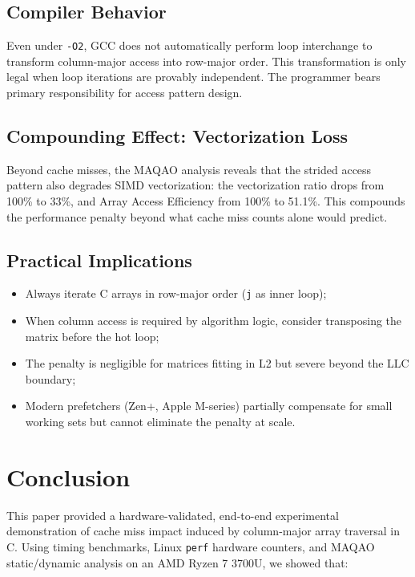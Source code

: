 \documentclass[conference]{IEEEtran}
\begin{document}
\subsection{Compiler Behavior}

Even under \texttt{-O2}, GCC does not automatically perform loop interchange to
transform column-major access into row-major order. This transformation is only
legal when loop iterations are provably independent. The programmer bears
primary responsibility for access pattern design.

\subsection{Compounding Effect: Vectorization Loss}

Beyond cache misses, the MAQAO analysis reveals that the strided access pattern
also degrades SIMD vectorization: the vectorization ratio drops from 100\% to
33\%, and Array Access Efficiency from 100\% to 51.1\%. This compounds the
performance penalty beyond what cache miss counts alone would predict.

\subsection{Practical Implications}

\begin{itemize}
  \item Always iterate C arrays in row-major order (\texttt{j} as inner loop);
  \item When column access is required by algorithm logic, consider transposing
        the matrix before the hot loop;
  \item The penalty is negligible for matrices fitting in L2 but severe beyond
        the LLC boundary;
  \item Modern prefetchers (Zen+, Apple M-series) partially compensate for
        small working sets but cannot eliminate the penalty at scale.
\end{itemize}

\section{Conclusion}
\label{sec:conclusion}

This paper provided a hardware-validated, end-to-end experimental demonstration
of cache miss impact induced by column-major array traversal in C. Using timing
benchmarks, Linux \texttt{perf} hardware counters, and MAQAO static/dynamic
analysis on an AMD Ryzen 7 3700U, we showed that:
\end{document}
